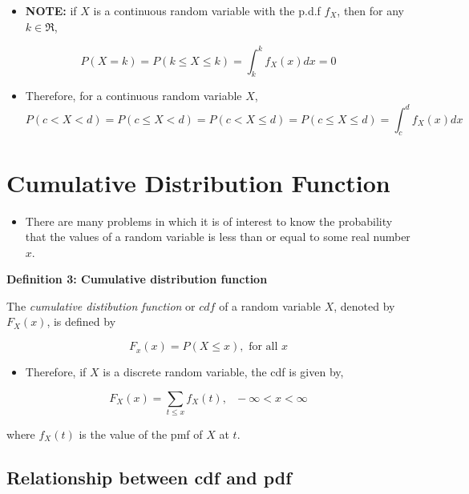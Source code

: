 \documentclass[]{book}
\providecommand{\tightlist}{%
  \setlength{\itemsep}{0pt}\setlength{\parskip}{0pt}}
\begin{document}
\begin{itemize}
\tightlist
\item
  \textbf{NOTE:} if \(X\) is a continuous random variable with the p.d.f \(f_X\), then for any \(k \in \Re\),
\end{itemize}

\[P(X=k) = P(k\leq X\leq k)=\int_k^kf_X(x)dx = 0\]

\begin{itemize}
\tightlist
\item
  Therefore, for a continuous random variable \(X\),
  \[P(c<X<d) = P(c\leq X<d) =  P(c < X\leq d)=  P(c \leq X\leq d)= \int_c^df_X(x)dx\]
\end{itemize}

\hypertarget{cumulative-distribution-function}{%
\section{Cumulative Distribution Function}\label{cumulative-distribution-function}}

\begin{itemize}
\tightlist
\item
  There are many problems in which it is of interest to know the probability that the values of a random variable is less than or equal to some real number \(x\).
\end{itemize}

\textbf{Definition 3: Cumulative distribution function}

The \emph{cumulative distibution function} or \(cdf\) of a random variable \(X\), denoted by \(F_X(x)\), is defined by

\[F_x(x) = P(X\leq x), \text{ for all } x \]

\begin{itemize}
\tightlist
\item
  Therefore, if \(X\) is a discrete random variable, the cdf is given by,
\end{itemize}

\[F_X(x)=\sum_{t\leq x}f_X(t), \text{ } -\infty < x<\infty\]

where \(f_X(t)\) is the value of the pmf of \(X\) at \(t\).

\hypertarget{relationship-between-cdf-and-pdf}{%
\subsection{Relationship between cdf and pdf}\label{relationship-between-cdf-and-pdf}}
\end{document}
